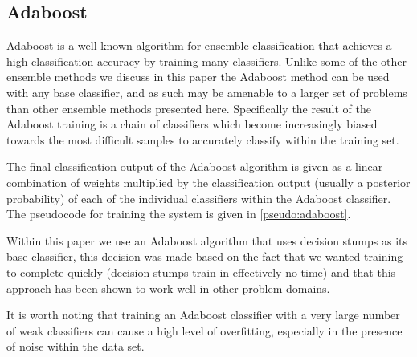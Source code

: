 \documentclass[ %
                    author={Sam Phippen},
                supervisor={Dr. Rafal Bogacz},
                     title={Real time voice activity detectors in noisy personal computing environments},
                  subtitle={},
                    degree={MEng},
                      year={2012} ]{thesis}
\begin{document}
\subsection{Adaboost}

Adaboost is a well known algorithm for ensemble classification that achieves
a high classification accuracy by training many classifiers. Unlike some of
the other ensemble methods we discuss in this paper the Adaboost method can
be used with any base classifier, and as such may be amenable to a larger set
of problems than other ensemble methods presented here. Specifically the result
of the Adaboost training is a chain of classifiers which become increasingly
biased towards the most difficult samples to accurately classify within the
training set.

The final classification output of the Adaboost algorithm is given as a linear
combination of weights multiplied by the classification output (usually a
posterior probability) of each of the individual classifiers within the Adaboost
classifier. The pseudocode for training the system is given in \ref{pseudo:adaboost}.

Within this paper we use an Adaboost algorithm that uses decision stumps as its
base classifier, this decision was made based on the fact that we wanted
training to complete quickly (decision stumps train in effectively no time) and
that this approach has been shown to work well in other problem
domains\cite{viola}.

It is worth noting that training an Adaboost classifier with a very large
number of weak classifiers can cause a high level of overfitting, especially
in the presence of noise within the data set.
\end{document}
